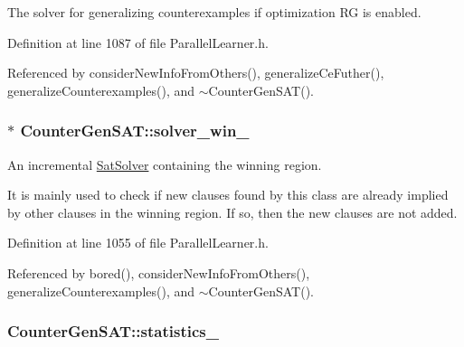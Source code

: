 The solver for generalizing counterexamples if optimization R\-G is enabled. 



Definition at line 1087 of file Parallel\-Learner.\-h.



Referenced by consider\-New\-Info\-From\-Others(), generalize\-Ce\-Futher(), generalize\-Counterexamples(), and $\sim$\-Counter\-Gen\-S\-A\-T().

\hypertarget{classCounterGenSAT_a4c209741406375df9ba19b830ca4d6f9}{
\subsubsection[{solver\-\_\-win\-\_\-}]{$\ast$ Counter\-Gen\-S\-A\-T\-::solver\-\_\-win\-\_\-\hspace{0.3cm}{\ttfamily [protected]}}}\label{classCounterGenSAT_a4c209741406375df9ba19b830ca4d6f9}


An incremental \hyperlink{classSatSolver}{Sat\-Solver} containing the winning region. 

It is mainly used to check if new clauses found by this class are already implied by other clauses in the winning region. If so, then the new clauses are not added. 

Definition at line 1055 of file Parallel\-Learner.\-h.



Referenced by bored(), consider\-New\-Info\-From\-Others(), generalize\-Counterexamples(), and $\sim$\-Counter\-Gen\-S\-A\-T().

\hypertarget{classCounterGenSAT_a0e7c47014a35bac7a6de0a61ee8d2c22}{
\subsubsection[{statistics\-\_\-}]{ Counter\-Gen\-S\-A\-T\-::statistics\-\_\-\hspace{0.3cm}{\ttfamily [protected]}}}\label{classCounterGenSAT_a0e7c47014a35bac7a6de0a61ee8d2c22}


